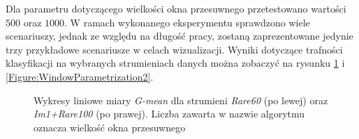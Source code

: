 Dla parametru dotyczącego wielkości okna przesuwnego przetestowano wartości $500$ oraz $1000$. W ramach wykonanego eksperymentu sprawdzono wiele scenariuszy, jednak ze względu na długość pracy, zostaną zaprezentowane jedynie trzy przykładowe scenariusze w celach wizualizacji. Wyniki dotyczące trafności klasyfikacji na wybranych strumieniach danych można zobaczyć na rysunku \ref{Figure:WindowParametrization1} i \ref{Figure:WindowParametrization2}.

\begin{figure}[h]
    \centering
    \qquad
    \caption{Wykresy liniowe miary \textit{G-mean} dla strumieni \textit{Rare60} (po lewej) oraz \textit{Im1+Rare100} (po prawej). Liczba zawarta w nazwie algorytmu oznacza wielkość okna przesuwnego}\label{Figure:WindowParametrization1}
\end{figure}

\newpage


